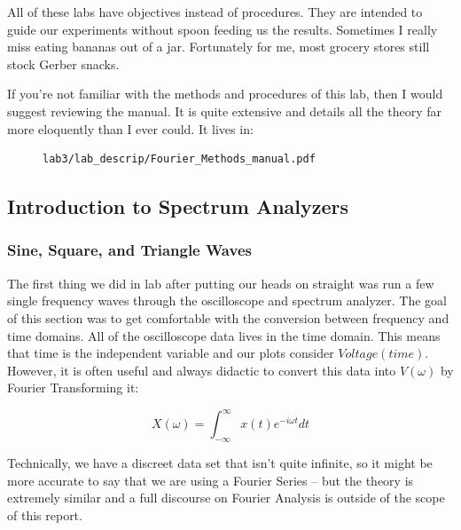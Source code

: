 \documentclass{article}
\begin{document}
All of these labs have objectives instead of procedures. They are intended to
guide our experiments without spoon feeding us the results. Sometimes I really
miss eating bananas out of a jar. Fortunately for me, most grocery stores still
stock Gerber snacks. 

If you're not familiar with the methods and procedures of this lab, then I
would suggest reviewing the manual. It is quite extensive and details all the
theory far more eloquently than I ever could. It lives in:

\begin{figure}[H]
\centering
\begin{minipage}{.8\textwidth}
\begin{tcolorbox}
\begin{verbatim}
lab3/lab_descrip/Fourier_Methods_manual.pdf
\end{verbatim}
\end{tcolorbox}
\end{minipage}
\end{figure}

\subsection{Introduction to Spectrum Analyzers}

\subsubsection{Sine, Square, and Triangle Waves}%
\label{ssub:sine_square_and_triangle_waves}

The first thing we did in lab after putting our heads on straight was run a few
single frequency waves through the oscilloscope and spectrum analyzer. The goal
of this section was to get comfortable with the conversion between frequency
and time domains. All of the oscilloscope data lives in the time domain.
This means that time is the independent variable and our plots consider
$Voltage(time)$. However, it is often useful and always didactic to convert
this data into $V(\omega)$ by Fourier Transforming it:

\begin{equation}
    X(\omega) = \int_{-\infty}^{\infty} x(t) e^{-i \omega t} dt
\end{equation}

Technically, we have a discreet data set that isn't quite infinite, so it might
be more accurate to say that we are using a Fourier Series -- but the theory is
extremely similar and a full discourse on Fourier Analysis is outside of the
scope of this report.
\end{document}
